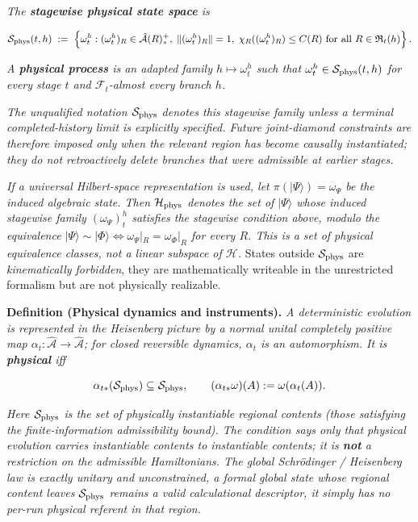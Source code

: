 \documentclass[11pt,a4paper]{article}
\begin{document}
\emph{The \textbf{stagewise physical state space} is}

\[
\mathcal{S}_{\rm phys}(t, h) \;:=\; \left\{ \omega_t^h : (\omega_t^h)_R \in \hat{\mathcal{A}}(R)_*^+,\; \|(\omega_t^h)_R\| = 1,\; \chi_R((\omega_t^h)_R) \le C(R) \text{ for all } R \in \mathfrak{R}_t(h) \right\}.
\]

\emph{A \textbf{physical process} is an adapted family $h \mapsto \omega_t^h$ such that $\omega_t^h \in \mathcal{S}_{\rm phys}(t, h)$ for every stage $t$ and $\mathcal{F}_t$-almost every branch $h$.}

\emph{The unqualified notation $\mathcal{S}_{\rm phys}$ denotes this stagewise family unless a terminal completed-history limit is explicitly specified. Future joint-diamond constraints are therefore imposed only when the relevant region has become causally instantiated; they do not retroactively delete branches that were admissible at earlier stages.}

\emph{If a universal Hilbert-space representation is used, let $\pi(|\Psi\rangle) = \omega_\Psi$ be the induced algebraic state. Then $\mathcal{H}_{\rm phys}$ denotes the set of $|\Psi\rangle$ whose induced stagewise family $(\omega_\Psi)_t^h$ satisfies the stagewise condition above, modulo the equivalence $|\Psi\rangle \sim |\Phi\rangle \iff \omega_\Psi|_R = \omega_\Phi|_R$ for every $R$. This is a set of physical equivalence classes, not a linear subspace of $\mathcal{H}$.} States outside $\mathcal{S}_{\rm phys}$ are \emph{kinematically forbidden}, they are mathematically writeable in the unrestricted formalism but are not physically realizable.

\textbf{Definition (Physical dynamics and instruments).} \emph{A deterministic evolution is represented in the Heisenberg picture by a normal unital completely positive map $\alpha_t: \hat{\mathcal{A}} \to \hat{\mathcal{A}}$; for closed reversible dynamics, $\alpha_t$ is an automorphism. It is \textbf{physical} iff}

\[
\alpha_{t*}(\mathcal{S}_{\rm phys}) \subseteq \mathcal{S}_{\rm phys}, \qquad (\alpha_{t*}\omega)(A) := \omega(\alpha_t(A)).
\]

\emph{Here $\mathcal{S}_{\rm phys}$ is the set of physically instantiable regional contents (those satisfying the finite-information admissibility bound). The condition says only that physical evolution carries instantiable contents to instantiable contents; it is \textbf{not} a restriction on the admissible Hamiltonians. The global Schrödinger / Heisenberg law is exactly unitary and unconstrained, a formal global state whose regional content leaves $\mathcal{S}_{\rm phys}$ remains a valid calculational descriptor, it simply has no per-run physical referent in that region.}
\end{document}
